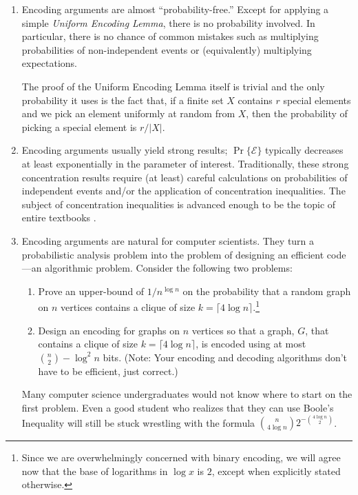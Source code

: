 \documentclass[prodmode,acmcsur]{acmsmall}
\begin{document}
\begin{enumerate}
\item Encoding arguments are almost ``probability-free.''  Except for
  applying a simple \emph{Uniform Encoding Lemma}, there is no
  probability involved.  In particular, there is no chance of
  common mistakes such as multiplying probabilities of non-independent
  events or (equivalently) multiplying expectations.

  The proof of the Uniform Encoding Lemma itself is trivial and the
  only probability it uses is the fact that, if a finite set $X$
  contains $r$ special elements and we pick an element uniformly at
  random from $X$, then the probability of picking a special element
  is $r/|X|$.

\item Encoding arguments usually yield strong results;
  $\Pr\{\mathcal{E}\}$ typically decreases at least exponentially in
  the parameter of interest. Traditionally, these strong concentration
  results require (at least) careful calculations on probabilities of
  independent events and/or the application of concentration
  inequalities.  The subject of concentration inequalities is advanced
  enough to be the topic of entire textbooks
  \cite{boucheron.lugosi.ea:concentration,dubhashi.panconesi:concentration}.
  
\item Encoding arguments are natural for computer scientists. They
  turn a probabilistic analysis problem into the problem of designing
  an efficient code---an algorithmic problem. Consider the following
  two problems:
  \begin{enumerate}

  \item Prove an upper-bound of $1/n^{\log n}$ on the probability that
    a random graph on $n$ vertices contains a clique of size $k=\lceil
    4\log n\rceil$.\footnote{Since we are overwhelmingly concerned with
    binary encoding, we will
    agree now that the base of logarithms in $\log x$ is $2$, except when
    explicitly stated otherwise.}

  \item Design an encoding for graphs on $n$ vertices so that a graph,
    $G$, that contains a clique of size $k=\lceil 4\log n\rceil$, is
    encoded using at most $\binom{n}{2}-\log^2 n$ bits. (Note: Your
    encoding and decoding algorithms don't have to be efficient, just
    correct.)
  \end{enumerate}
  Many computer science undergraduates would not know where to start
  on the first problem.  Even a good student who realizes that they
  can use Boole's Inequality will still be stuck wrestling with the
  formula $\binom{n}{4\log n}2^{-\binom{4\log n}{2}}$.
\end{enumerate}
\end{document}

